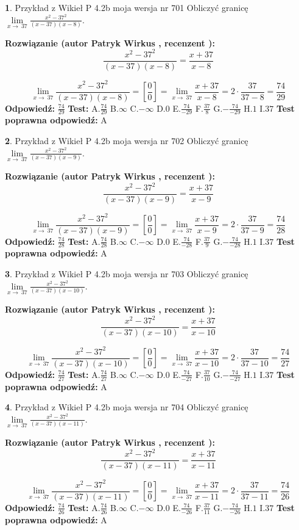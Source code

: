 \documentclass[12pt, a4paper]{article}
\theoremstyle{definition} %
\newtheorem{zad}{}
\newcommand{\zadStart}[1]{\begin{zad}#1\newline}
\newcommand{\zadStop}{\end{zad}}
\newcommand{\rozwStart}[2]{\noindent \textbf{Rozwiązanie (autor #1 , recenzent #2): }\newline}
\newcommand{\rozwStop}{\newline}
\newcommand{\odpStart}{\noindent \textbf{Odpowiedź:}\newline}
\newcommand{\odpStop}{\newline}
\newcommand{\testStart}{\noindent \textbf{Test:}\newline}
\newcommand{\testStop}{\newline}
\newcommand{\kluczStart}{\noindent \textbf{Test poprawna odpowiedź:}\newline}
\newcommand{\kluczStop}{\newline}
\begin{document}
\zadStart{Przykład z Wikieł P 4.2b moja wersja nr 701}
Obliczyć granicę $\lim\limits_{x\to\ 37}\frac{x^{2}-37^{2}}{(x-37)(x-8)}$.
\zadStop
\rozwStart{Patryk Wirkus}{}
$$\frac{x^{2}-37^{2}}{(x-37)(x-8)}=\frac{x+37}{x-8}$$

$$\lim\limits_{x\to\ 37}\frac{x^{2}-37^{2}}{(x-37)(x-8)}=[\frac{0}{0}]=\lim\limits_{x\to\ 37}\frac{x+37}{x-8}=2 \cdot \frac{37}{37-8} = \frac{74}{29}$$
\rozwStop
\odpStart
$\frac{74}{29}$
\odpStop
\testStart
A.$\frac{74}{29}$
B.$\infty$
C.$-\infty$
D.$0$
E.$\frac{74}{-29}$
F.$\frac{37}{8}$
G.$-\frac{74}{-29}$
H.$1$
I.$37$
\testStop
\kluczStart
A
\kluczStop



\zadStart{Przykład z Wikieł P 4.2b moja wersja nr 702}
Obliczyć granicę $\lim\limits_{x\to\ 37}\frac{x^{2}-37^{2}}{(x-37)(x-9)}$.
\zadStop
\rozwStart{Patryk Wirkus}{}
$$\frac{x^{2}-37^{2}}{(x-37)(x-9)}=\frac{x+37}{x-9}$$

$$\lim\limits_{x\to\ 37}\frac{x^{2}-37^{2}}{(x-37)(x-9)}=[\frac{0}{0}]=\lim\limits_{x\to\ 37}\frac{x+37}{x-9}=2 \cdot \frac{37}{37-9} = \frac{74}{28}$$
\rozwStop
\odpStart
$\frac{74}{28}$
\odpStop
\testStart
A.$\frac{74}{28}$
B.$\infty$
C.$-\infty$
D.$0$
E.$\frac{74}{-28}$
F.$\frac{37}{9}$
G.$-\frac{74}{-28}$
H.$1$
I.$37$
\testStop
\kluczStart
A
\kluczStop



\zadStart{Przykład z Wikieł P 4.2b moja wersja nr 703}
Obliczyć granicę $\lim\limits_{x\to\ 37}\frac{x^{2}-37^{2}}{(x-37)(x-10)}$.
\zadStop
\rozwStart{Patryk Wirkus}{}
$$\frac{x^{2}-37^{2}}{(x-37)(x-10)}=\frac{x+37}{x-10}$$

$$\lim\limits_{x\to\ 37}\frac{x^{2}-37^{2}}{(x-37)(x-10)}=[\frac{0}{0}]=\lim\limits_{x\to\ 37}\frac{x+37}{x-10}=2 \cdot \frac{37}{37-10} = \frac{74}{27}$$
\rozwStop
\odpStart
$\frac{74}{27}$
\odpStop
\testStart
A.$\frac{74}{27}$
B.$\infty$
C.$-\infty$
D.$0$
E.$\frac{74}{-27}$
F.$\frac{37}{10}$
G.$-\frac{74}{-27}$
H.$1$
I.$37$
\testStop
\kluczStart
A
\kluczStop



\zadStart{Przykład z Wikieł P 4.2b moja wersja nr 704}
Obliczyć granicę $\lim\limits_{x\to\ 37}\frac{x^{2}-37^{2}}{(x-37)(x-11)}$.
\zadStop
\rozwStart{Patryk Wirkus}{}
$$\frac{x^{2}-37^{2}}{(x-37)(x-11)}=\frac{x+37}{x-11}$$

$$\lim\limits_{x\to\ 37}\frac{x^{2}-37^{2}}{(x-37)(x-11)}=[\frac{0}{0}]=\lim\limits_{x\to\ 37}\frac{x+37}{x-11}=2 \cdot \frac{37}{37-11} = \frac{74}{26}$$
\rozwStop
\odpStart
$\frac{74}{26}$
\odpStop
\testStart
A.$\frac{74}{26}$
B.$\infty$
C.$-\infty$
D.$0$
E.$\frac{74}{-26}$
F.$\frac{37}{11}$
G.$-\frac{74}{-26}$
H.$1$
I.$37$
\testStop
\kluczStart
A
\kluczStop
\end{document}
